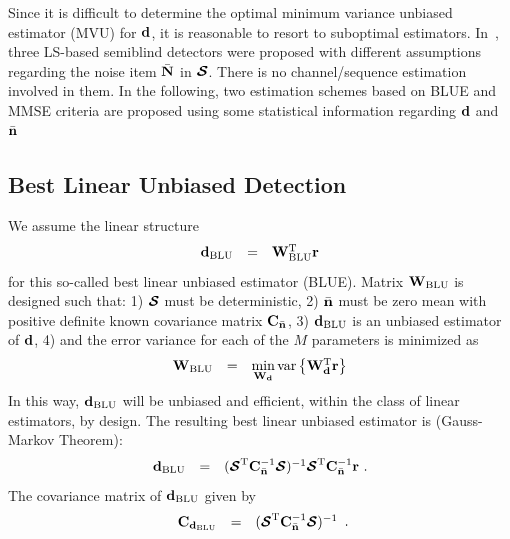 \documentclass[a4paper,10pt,fleqn, twocolumn]{IEEETran}
\newcommand{\br}{{\mathbf r}}
\newcommand{\bC}{{\bf C}}
\newcommand{\bd}{{\bf d}}
\newcommand{\bn}{{\bf n}}
\newcommand{\bbf}{{\bf d}}
\newcommand{\bN}{{\bf N}}
\newcommand{\bW}{{\bf W}}
\newcommand{\bcS}{{\mbox {\boldmath ${\cal S}$}}}
\begin{document}
Since it is difficult to determine the optimal minimum variance
unbiased estimator (MVU) for $\bd$, it is reasonable to resort to
suboptimal estimators. In~\cite{Wang03d,Wang03e}, three LS-based
semiblind detectors were proposed with different assumptions
regarding the noise item $\bar{\bN}$ in $\bcS$. There is no
channel/sequence estimation involved in them. In the following,
two estimation schemes based on BLUE and MMSE criteria are
proposed using some statistical information regarding $\bd$ and
$\bar\bn$

\subsection{Best Linear Unbiased Detection}
We assume the linear structure
\begin{equation}
\begin{array}{rcl}
{\bbf}_{\rm BLU}&=&\bW_{\rm BLU}^{\rm T}\br
\end{array}
\end{equation}
\noindent for this so-called best linear unbiased estimator
(BLUE). Matrix $\bW_{\rm BLU}$ is designed such that: 1) $\bcS$
must be deterministic, 2) $\bar{\bn}$ must be zero mean with
positive definite known covariance matrix $\bC_{\bar{\bn}}$, 3)
${\bbf}_{\rm BLU}$ is an unbiased estimator of $\bbf$, 4) and the
error variance for each of the $M$ parameters is minimized as
\begin{equation}
\begin{array}{rcl}
\bW_{\rm BLU}&=&\min\limits_{\bW_{\bbf}}
\mbox{var}\left\{\bW_{\bbf}^{\rm T}\br\right\}
\end{array}
\end{equation}
\noindent In this way, ${\bbf}_{\rm BLU}$ will be unbiased and
efficient, within the class of linear estimators, by design. The
resulting best linear unbiased estimator is (Gauss-Markov
Theorem):
\begin{equation}
\begin{array}{rcl}
{\bbf}_{\rm BLU}&=&(\bcS^{\rm
T}\bC_{\bar{\bn}}^{-1}\bcS)^{-1}\bcS^{\rm
T}\bC_{\bar{\bn}}^{-1}\br\ .
\end{array} \label{BLUE}
\end{equation}
\noindent The covariance matrix of ${\bbf}_{\rm BLU}$ given by
\begin{equation}
\begin{array}{rcl}
{\bC}_{\bbf_{\rm BLU}}&=&(\bcS^{\rm
T}\bC_{\bar{\bn}}^{-1}\bcS)^{-1}
\end{array}.
\end{equation}
\end{document}
